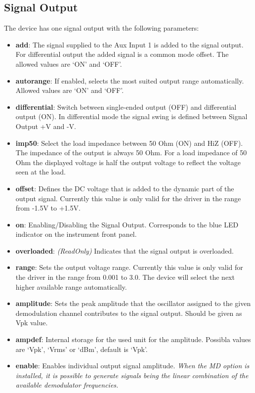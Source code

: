 \documentclass[11pt]{article} %
\begin{document}
\subsection{Signal Output}
The device has one signal output with the following parameters:
\begin{itemize}
\item {\bf add}: The signal supplied to the Aux Input 1 is added to the signal output. For differential output the added signal is a common mode offset. The allowed values are `ON' and `OFF'.
\item {\bf autorange}: If enabled, selects the most suited output range automatically. Allowed values are `ON' and `OFF'.
\item {\bf differential}: Switch between single-ended output (OFF) and differential output (ON). In differential mode the signal swing is defined between Signal Output +V and -V.
\item {\bf imp50}: Select the load impedance between 50 Ohm (ON) and HiZ (OFF). The impedance of the output is always 50 Ohm. For a load impedance of 50 Ohm the displayed voltage is half the output voltage to reflect the voltage seen at the load.
\item {\bf offset}: Defines the DC voltage that is added to the dynamic part of the output signal. Currently this value is only valid for the driver in the range from -1.5V to +1.5V.
\item {\bf on}: Enabling/Disabling the Signal Output. Corresponds to the blue LED indicator on the instrument front panel.
\item {\bf overloaded}: {\it (ReadOnly)} Indicates that the signal output is overloaded.
\item {\bf range}: Sets the output voltage range. Currently this value is only valid for the driver in the range from 0.001 to 3.0. The device will select the next higher available range automatically.
\item {\bf amplitude}: Sets the peak amplitude that the oscillator assigned to the given demodulation channel contributes to the signal output. Should be given as Vpk value.
\item {\bf ampdef}: Internal storage for the used unit for the amplitude. Possibla values are `Vpk', `Vrms' or `dBm', default is `Vpk'.
\item {\bf enable}: Enables individual output signal amplitude. {\it When the MD option is installed, it is possible to generate signals being the linear combination of the available demodulator frequencies.}
\end{itemize}
\end{document}
